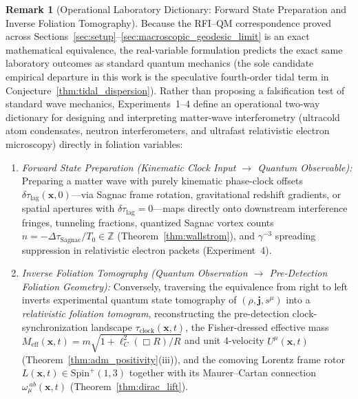 \documentclass[11pt, a4paper]{article}
\theoremstyle{definition}
\newtheorem{remark}[theorem]{Remark}
\begin{document}
\begin{remark}[Operational Laboratory Dictionary: Forward State Preparation and Inverse Foliation Tomography]
\label{rem:bidirectional_lab_protocols}
Because the RFI--QM correspondence proved across Sections~\ref{sec:setup}--\ref{sec:macroscopic_geodesic_limit} is an exact mathematical equivalence, the real-variable formulation predicts the exact same laboratory outcomes as standard quantum mechanics (the sole candidate empirical departure in this work is the speculative fourth-order tidal term in Conjecture~\ref{thm:tidal_dispersion}). Rather than proposing a falsification test of standard wave mechanics, Experiments~1--4 define an operational two-way dictionary for designing and interpreting matter-wave interferometry (ultracold atom condensates, neutron interferometers, and ultrafast relativistic electron microscopy) directly in foliation variables:
\begin{enumerate}[label=(\alph*), nosep]
    \item \textit{Forward State Preparation (Kinematic Clock Input $\to$ Quantum Observable):} Preparing a matter wave with purely kinematic phase-clock offsets $\delta\tau_{\text{lag}}(\mathbf{x}, 0)$---via Sagnac frame rotation, gravitational redshift gradients, or spatial apertures with $\delta\tau_{\text{lag}} = 0$---maps directly onto downstream interference fringes, tunneling fractions, quantized Sagnac vortex counts $n = -\Delta\tau_{\text{Sagnac}}/T_0 \in \mathbb{Z}$ (Theorem~\ref{thm:wallstrom}), and $\gamma^{-3}$ spreading suppression in relativistic electron packets (Experiment~4).
    \item \textit{Inverse Foliation Tomography (Quantum Observation $\to$ Pre-Detection Foliation Geometry):} Conversely, traversing the equivalence from right to left inverts experimental quantum state tomography of $(\rho, \mathbf{j}, s^\mu)$ into a \textit{relativistic foliation tomogram}, reconstructing the pre-detection clock-synchronization landscape $\tau_{\text{clock}}(\mathbf{x}, t)$, the Fisher-dressed effective mass $M_{\text{eff}}(\mathbf{x}, t) = m\sqrt{1 + \ell_C^2(\Box R)/R}$ and unit 4-velocity $U^\mu(\mathbf{x}, t)$ (Theorem~\ref{thm:adm_positivity}(iii)), and the comoving Lorentz frame rotor $L(\mathbf{x}, t) \in \text{Spin}^+(1,3)$ together with its Maurer--Cartan connection $\omega_\mu^{\ ab}(\mathbf{x}, t)$ (Theorem~\ref{thm:dirac_lift}).
\end{enumerate}
\end{remark}


\end{document}
